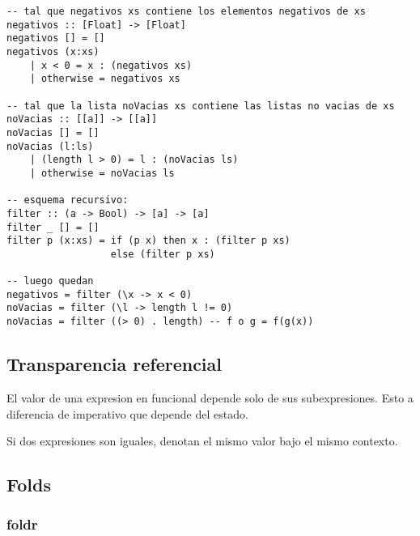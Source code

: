 \documentclass{report}
\theoremstyle{definition} %
\begin{document}
\begin{verbatim}
-- tal que negativos xs contiene los elementos negativos de xs
negativos :: [Float] -> [Float]
negativos [] = []
negativos (x:xs)
    | x < 0 = x : (negativos xs)
    | otherwise = negativos xs

-- tal que la lista noVacias xs contiene las listas no vacias de xs
noVacias :: [[a]] -> [[a]]
noVacias [] = []
noVacias (l:ls)
    | (length l > 0) = l : (noVacias ls)
    | otherwise = noVacias ls

-- esquema recursivo:
filter :: (a -> Bool) -> [a] -> [a]
filter _ [] = []
filter p (x:xs) = if (p x) then x : (filter p xs)
                  else (filter p xs)

-- luego quedan
negativos = filter (\x -> x < 0)
noVacias = filter (\l -> length l != 0)
noVacias = filter ((> 0) . length) -- f o g = f(g(x))

\end{verbatim}

\subsection{Transparencia referencial}

El valor de una expresion en funcional depende solo de sus subexpresiones. Esto
a diferencia de imperativo que depende del estado.

Si dos expresiones son iguales, denotan el mismo valor bajo el mismo contexto.

\subsection{Folds}

\subsubsection{foldr}
\end{document}
